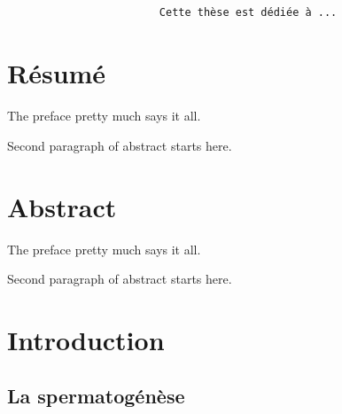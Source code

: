 \documentclass[12pt,twoside]{reedthesis}
\theoremstyle{definition}
\theoremstyle{definition}
\theoremstyle{remark}
\begin{document}
  ~
  
  ~
  
  ~
  
  ~
  
  ~
  
  ~
  
  ~
  
  ~
  
  ~
  
  ~
  
  ~
  
  ~
  
  ~
  
  ~
  
  ~
  
  ~
  
  ~
  
  ~
  
  ~
  
  ~
  
  ~
  
  \begin{verbatim}
                        Cette thèse est dédiée à ...
  \end{verbatim}
  
  \chapter*{Résumé}\label{resume}
  
  The preface pretty much says it all. \par
  
  Second paragraph of abstract starts here.
  
  \chapter*{Abstract}\label{abstract}
  
  The preface pretty much says it all. \par
  
  Second paragraph of abstract starts here.
  
  \chapter{Introduction}\label{introInf}
  
  \section{La spermatogénèse}\label{la-spermatogenese}
  
\end{document}
